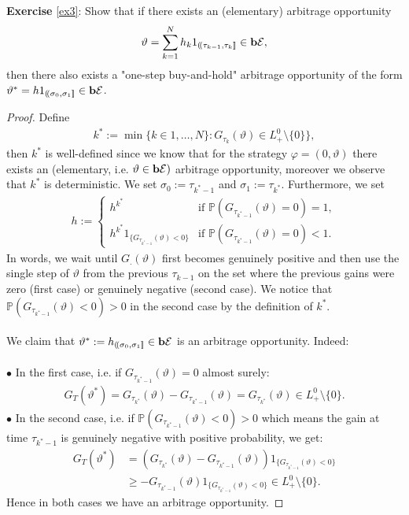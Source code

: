 \documentclass[12pt,a4paper, twoside]{article}
\theoremstyle{definition}
\newcommand{\PP}{\mathbb{P}} %
\newcommand{\simple}{\textbf{\text{b}}\mathcal{E}}
\begin{document}
\newpage
\noindent \textbf{Exercise} \ref{ex3}: Show that if there exists an (elementary) arbitrage opportunity
\begin{align*}
\vartheta = \sum_{k=1}^N h_k 1_{ (\!( \tau_{k-1}, \tau_k ]\!]} \in \simple,
\end{align*}
then there also exists a "one-step buy-and-hold" arbitrage opportunity of the form $\vartheta^* = h1_{(\!( \sigma_0, \sigma_1]\!]} \in \simple$.
\begin{proof}
Define
\begin{align*}
k^*:= \min\{ k \in 1, \dots , N\} : G_{\tau_k} ( \vartheta) \in L_+^0 \setminus \{0\}\},
\end{align*}
then $k^*$ is well-defined since we know that for the strategy $\varphi = (0, \vartheta)$ there exists an (elementary, i.e. $\vartheta \in \simple)$ arbitrage opportunity, moreover we observe that $k^*$ is deterministic. We set $\sigma_0 := \tau_{k^*-1}$ and $\sigma_1:= \tau_{k^*}$. Furthermore, we set
\begin{align*}
h:= \begin{cases}
h^{k^*} & \text{if } \PP(G_{\tau_{k^*-1}}( \vartheta)=0)=1, \\
h^{k^*}1_{\{ G_{ \tau_{k^*-1}}( \vartheta)<0\}} & \text{if } \PP(G_{ \tau_{k^*-1}}( \vartheta)=0)<1.
 \end{cases}
\end{align*}
In words, we wait until $G_.( \vartheta)$ first becomes genuinely positive and then use the single step of $\vartheta$ from the previous $\tau_{k-1}$ on the set where the previous gains were zero (first case) or genuinely negative (second case). We notice that $\PP(G_{\tau_{k^*-1}} ( \vartheta) <0)>0$ in the second case by the definition of $k^*$.
\\\\
We claim that $\vartheta^* := h_{ (\!( \sigma_0, \sigma_1]\!]} \in \simple$ is an arbitrage opportunity. Indeed:
\\
\\
$\bullet$ In the first case, i.e. if $G_{\tau_{k^*-1}}( \vartheta)=0$ almost surely:
\begin{align*}
G_T( \vartheta^*)= G_{\tau_{k^*}}( \vartheta)- G_{\tau_{k^*-1}}( \vartheta)= G_{\tau_{k^*}}( \vartheta) \in L_+^0 \setminus \{0\}.
\end{align*}
$\bullet$ In the second case, i.e. if $\PP( G_{ \tau_{k^*-1}}( \vartheta) <0)>0$ which means the gain at time $\tau_{k^*-1}$ is genuinely negative with positive probability, we get:
\begin{align*}
G_T( \vartheta^*)&= \left(  G_{\tau_{k^*}}( \vartheta)- G_{\tau_{k^*-1}}( \vartheta) \right)1_{ \{ G_{\tau_{k^*-1}}( \vartheta)<0\}} \\
& \geq  - G_{\tau_{k^*-1}}( \vartheta)1_{ \{ G_{\tau_{k^*-1}}( \vartheta)<0\}} \in L_+^0 \setminus \{0\}.
\end{align*}
Hence in both cases we have an arbitrage opportunity. 
\end{proof}
\end{document}
